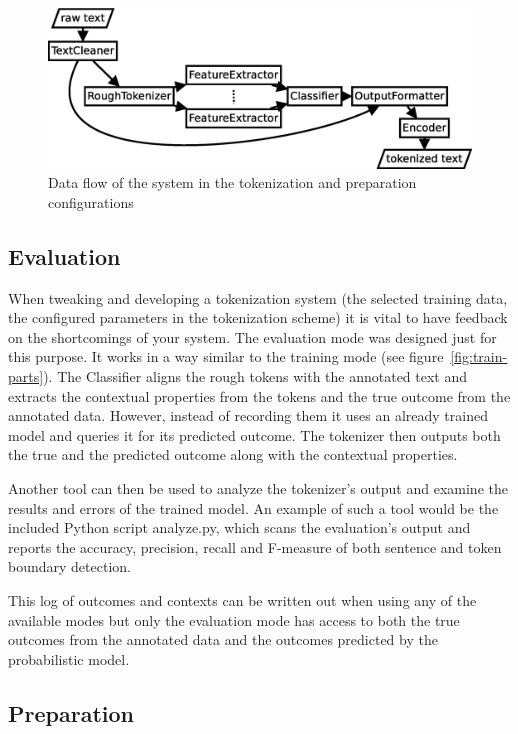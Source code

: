 \begin{figure}
  \includegraphics[width=\textwidth]{img/tokenize-parts.eps}
  \caption{Data flow of the system in the tokenization and preparation
           configurations}
  \label{fig:tokenize-parts}
\end{figure}

\subsection{Evaluation}

When tweaking and developing a tokenization system (the selected training data,
the configured parameters in the tokenization scheme) it is vital to have
feedback on the shortcomings of your system. The evaluation mode was designed
just for this purpose. It works in a way similar to the training mode (see
figure~\ref{fig:train-parts}). The Classifier aligns the rough tokens with the
annotated text and extracts the contextual properties from the tokens and the
true outcome from the annotated data. However, instead of recording them it
uses an already trained model and queries it for its predicted outcome. The
tokenizer then outputs both the true and the predicted outcome along with the
contextual properties.

Another tool can then be used to analyze the tokenizer's output and examine the
results and errors of the trained model. An example of such a tool would be the
included Python script analyze.py, which scans the evaluation's output and
reports the accuracy, precision, recall and F-measure of both sentence and
token boundary detection.

This log of outcomes and contexts can be written out when using any of the
available modes but only the evaluation mode has access to both the true
outcomes from the annotated data and the outcomes predicted by the
probabilistic model.

\subsection{Preparation}

